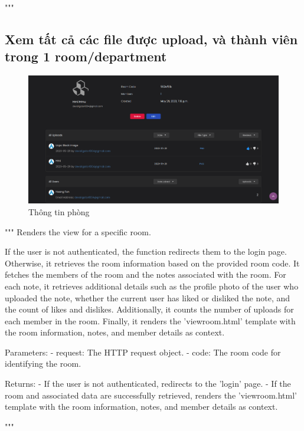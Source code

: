 \documentclass[paper=a4wide, fontsize=12pt]{scrartcl}	 %
\begin{document}
    """
\subsection{Xem tất cả các file được upload, và thành viên trong 1 room/department}
\begin{figure}[H]
    \centering
    \includegraphics[scale=0.4]{demo/view_room.png}
    \caption{Thông tin phòng}
\end{figure}
"""
    Renders the view for a specific room.

    If the user is not authenticated, the function redirects them to the login page.
    Otherwise, it retrieves the room information based on the provided room code.
    It fetches the members of the room and the notes associated with the room.
    For each note, it retrieves additional details such as the profile photo of the user who uploaded the note,
    whether the current user has liked or disliked the note, and the count of likes and dislikes.
    Additionally, it counts the number of uploads for each member in the room.
    Finally, it renders the 'viewroom.html' template with the room information, notes, and member details as context.

    Parameters:
    - request: The HTTP request object.
    - code: The room code for identifying the room.

    Returns:
    - If the user is not authenticated, redirects to the 'login' page.
    - If the room and associated data are successfully retrieved, renders the 'viewroom.html' template with the room information, notes, and member details as context.

    """
\end{document}
